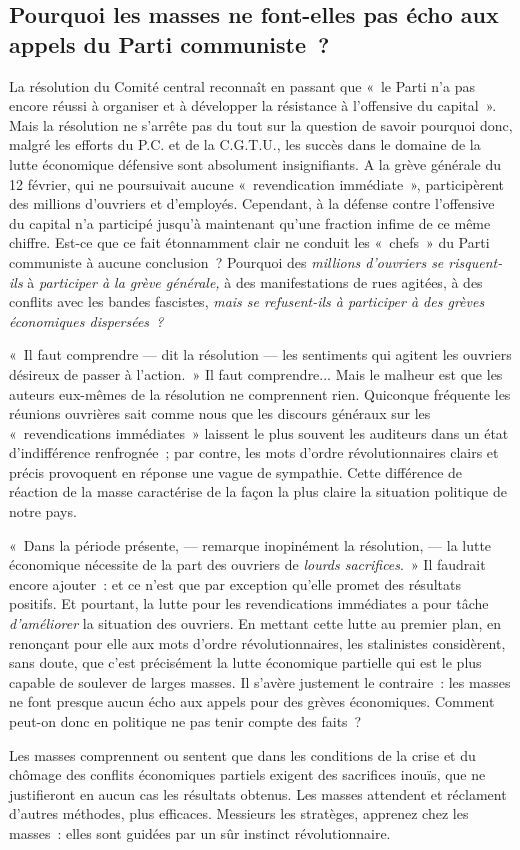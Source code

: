 \documentclass[french,twoside]{book} %
\begin{document}
\subsection[{Pourquoi les masses ne font-elles pas écho aux appels du Parti communiste ?}]{Pourquoi les masses ne font-elles pas écho aux appels du Parti communiste ?}
\noindent La résolution du Comité central reconnaît en passant que « le Parti n’a pas encore réussi à organiser et à développer la résistance à l’offensive du capital ». Mais la résolution ne s’arrête pas du tout sur la question de savoir pourquoi donc, malgré les efforts du P.C. et de la C.G.T.U., les succès dans le domaine de la lutte économique défensive sont absolument insignifiants. A la grève générale du 12 février, qui ne poursuivait aucune « revendication  immédiate », participèrent des millions d’ouvriers et d’employés. Cependant, à la défense contre l’offensive du capital n’a participé jusqu’à maintenant qu’une fraction infime de ce même chiffre. Est-ce que ce fait étonnamment clair ne conduit les « chefs » du Parti communiste à aucune conclusion ? Pourquoi des \emph{millions d’ouvriers se risquent-ils} à \emph{participer à la grève générale,} à des manifestations de rues agitées, à des conflits avec les bandes fascistes, \emph{mais se refusent-ils à participer à des grèves économiques dispersées ?}\par
« Il faut comprendre — dit la résolution — les sentiments qui agitent les ouvriers désireux de passer à l’action. » Il faut comprendre... Mais le malheur est que les auteurs eux-mêmes de la résolution ne comprennent rien. Quiconque fréquente les réunions ouvrières sait comme nous que les discours généraux sur les « revendications immédiates » laissent le plus souvent les auditeurs dans un état d’indifférence renfrognée ; par contre, les mots d’ordre révolutionnaires clairs et précis provoquent en réponse une vague de sympathie. Cette différence de réaction de la masse caractérise de la façon la plus claire la situation politique de notre pays.\par
« Dans la période présente, — remarque inopinément la résolution, — la lutte économique nécessite de la part des ouvriers de \emph{lourds sacrifices}. » Il faudrait encore ajouter : et ce n’est que par exception qu’elle promet des résultats positifs. Et pourtant, la lutte pour les revendications immédiates a pour tâche \emph{d’améliorer} la situation des ouvriers. En mettant cette lutte au premier plan, en renonçant pour elle aux mots d’ordre révolutionnaires, les stalinistes considèrent, sans doute, que c’est précisément la lutte économique partielle qui est le plus capable de soulever de larges masses. Il s’avère justement le contraire : les masses ne font presque aucun écho aux appels  pour des grèves économiques. Comment peut-on donc en politique ne pas tenir compte des faits ?\par
Les masses comprennent ou sentent que dans les conditions de la crise et du chômage des conflits économiques partiels exigent des sacrifices inouïs, que ne justifieront en aucun cas les résultats obtenus. Les masses attendent et réclament d’autres méthodes, plus efficaces. Messieurs les stratèges, apprenez chez les masses : elles sont guidées par un sûr instinct révolutionnaire.
\end{document}
